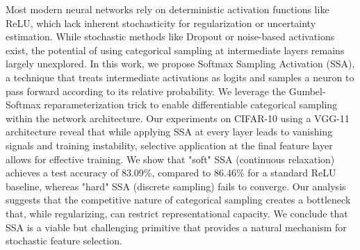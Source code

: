 Most modern neural networks rely on deterministic activation functions like ReLU, which lack inherent stochasticity for regularization or uncertainty estimation. While stochastic methods like Dropout or noise-based activations exist, the potential of using categorical sampling at intermediate layers remains largely unexplored. In this work, we propose Softmax Sampling Activation (SSA), a technique that treats intermediate activations as logits and samples a neuron to pass forward according to its relative probability. We leverage the Gumbel-Softmax reparameterization trick to enable differentiable categorical sampling within the network architecture. Our experiments on CIFAR-10 using a VGG-11 architecture reveal that while applying SSA at every layer leads to vanishing signals and training instability, selective application at the final feature layer allows for effective training. We show that "soft" SSA (continuous relaxation) achieves a test accuracy of 83.09\%, compared to 86.46\% for a standard ReLU baseline, whereas "hard" SSA (discrete sampling) fails to converge. Our analysis suggests that the competitive nature of categorical sampling creates a bottleneck that, while regularizing, can restrict representational capacity. We conclude that SSA is a viable but challenging primitive that provides a natural mechanism for stochastic feature selection.
